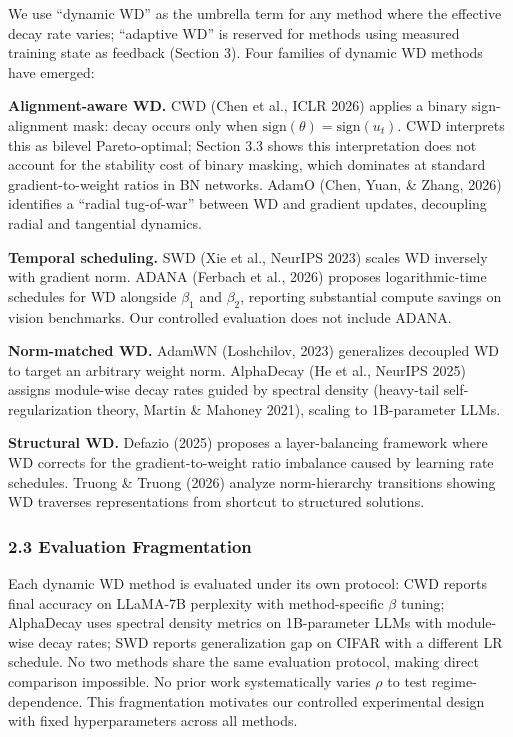 \documentclass[
]{article}
\begin{document}
We use ``dynamic WD'' as the umbrella term for any method where the
effective decay rate varies; ``adaptive WD'' is reserved for methods
using measured training state as feedback (Section 3). Four families of
dynamic WD methods have emerged:

\textbf{Alignment-aware WD.} CWD (Chen et al., ICLR 2026) applies a
binary sign-alignment mask: decay occurs only when
\(\text{sign}(\theta) = \text{sign}(u_t)\). CWD interprets this as
bilevel Pareto-optimal; Section 3.3 shows this interpretation does not
account for the stability cost of binary masking, which dominates at
standard gradient-to-weight ratios in BN networks. AdamO (Chen, Yuan, \&
Zhang, 2026) identifies a ``radial tug-of-war'' between WD and gradient
updates, decoupling radial and tangential dynamics.

\textbf{Temporal scheduling.} SWD (Xie et al., NeurIPS 2023) scales WD
inversely with gradient norm. ADANA (Ferbach et al., 2026) proposes
logarithmic-time schedules for WD alongside \(\beta_1\) and \(\beta_2\),
reporting substantial compute savings on vision benchmarks. Our
controlled evaluation does not include ADANA.

\textbf{Norm-matched WD.} AdamWN (Loshchilov, 2023) generalizes
decoupled WD to target an arbitrary weight norm. AlphaDecay (He et al.,
NeurIPS 2025) assigns module-wise decay rates guided by spectral density
(heavy-tail self-regularization theory, Martin \& Mahoney 2021), scaling
to 1B-parameter LLMs.

\textbf{Structural WD.} Defazio (2025) proposes a layer-balancing
framework where WD corrects for the gradient-to-weight ratio imbalance
caused by learning rate schedules. Truong \& Truong (2026) analyze
norm-hierarchy transitions showing WD traverses representations from
shortcut to structured solutions.

\hypertarget{evaluation-fragmentation}{%
\subsubsection{2.3 Evaluation
Fragmentation}\label{evaluation-fragmentation}}

Each dynamic WD method is evaluated under its own protocol: CWD reports
final accuracy on LLaMA-7B perplexity with method-specific \(\beta\)
tuning; AlphaDecay uses spectral density metrics on 1B-parameter LLMs
with module-wise decay rates; SWD reports generalization gap on CIFAR
with a different LR schedule. No two methods share the same evaluation
protocol, making direct comparison impossible. No prior work
systematically varies \(\rho\) to test regime-dependence. This
fragmentation motivates our controlled experimental design with fixed
hyperparameters across all methods.
\end{document}
